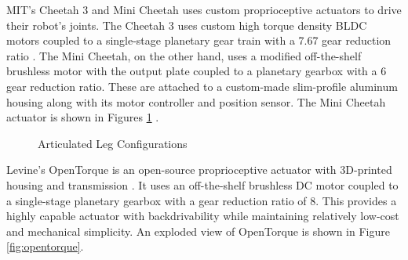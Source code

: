 \documentclass[english]{upeeei}
\begin{document}
MIT's Cheetah 3 and Mini Cheetah uses custom proprioceptive actuators to drive their robot's joints. The Cheetah 3 uses custom high torque density BLDC motors coupled to a single-stage planetary gear train with a 7.67 gear reduction ratio \cite{mitcheetah3}. The Mini Cheetah, on the other hand, uses a modified off-the-shelf brushless motor with the output plate coupled to a planetary gearbox with a 6 gear reduction ratio. These are attached to a custom-made slim-profile aluminum housing along with its motor controller and position sensor. The Mini Cheetah actuator is shown in Figures \ref{fig:mini-cheetah-actuator} \cite{minicheetah}.

\begin{figure}[H]
\begin{centering}
\par\end{centering}
\begin{centering}
\par\end{centering}
\caption{Articulated Leg Configurations\label{fig:mini-cheetah-actuator}}
\end{figure}

Levine's OpenTorque is an open-source proprioceptive actuator with 3D-printed housing and transmission \cite{opentorque}. It uses an off-the-shelf brushless DC motor coupled to a single-stage planetary gearbox with a gear reduction ratio of 8. This provides a highly capable actuator with backdrivability while maintaining relatively low-cost and mechanical simplicity. An exploded view of OpenTorque is shown in Figure \ref{fig:opentorque}.
\end{document}
